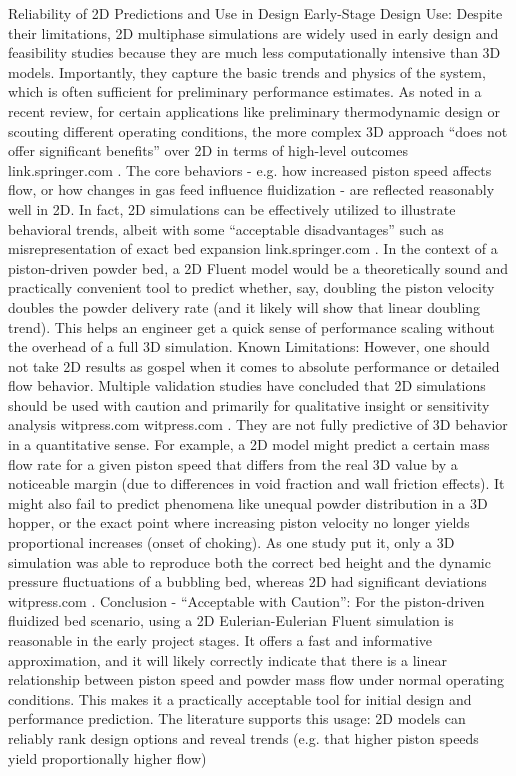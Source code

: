 Reliability of 2D Predictions and Use in Design
Early-Stage Design Use: Despite their limitations, 2D multiphase simulations are widely used in early design and feasibility studies because they are much less computationally intensive than 3D models. Importantly, they capture the basic trends and physics of the system, which is often sufficient for preliminary performance estimates. As noted in a recent review, for certain applications like preliminary thermodynamic design or scouting different operating conditions, the more complex 3D approach “does not offer significant benefits” over 2D in terms of high-level outcomes
link.springer.com
. The core behaviors - e.g. how increased piston speed affects flow, or how changes in gas feed influence fluidization - are reflected reasonably well in 2D. In fact, 2D simulations can be effectively utilized to illustrate behavioral trends, albeit with some “acceptable disadvantages” such as misrepresentation of exact bed expansion
link.springer.com
. In the context of a piston-driven powder bed, a 2D Fluent model would be a theoretically sound and practically convenient tool to predict whether, say, doubling the piston velocity doubles the powder delivery rate (and it likely will show that linear doubling trend). This helps an engineer get a quick sense of performance scaling without the overhead of a full 3D simulation. Known Limitations: However, one should not take 2D results as gospel when it comes to absolute performance or detailed flow behavior. Multiple validation studies have concluded that 2D simulations should be used with caution and primarily for qualitative insight or sensitivity analysis
witpress.com
witpress.com
. They are not fully predictive of 3D behavior in a quantitative sense. For example, a 2D model might predict a certain mass flow rate for a given piston speed that differs from the real 3D value by a noticeable margin (due to differences in void fraction and wall friction effects). It might also fail to predict phenomena like unequal powder distribution in a 3D hopper, or the exact point where increasing piston velocity no longer yields proportional increases (onset of choking). As one study put it, only a 3D simulation was able to reproduce both the correct bed height and the dynamic pressure fluctuations of a bubbling bed, whereas 2D had significant deviations
witpress.com
. Conclusion - “Acceptable with Caution”: For the piston-driven fluidized bed scenario, using a 2D Eulerian-Eulerian Fluent simulation is reasonable in the early project stages. It offers a fast and informative approximation, and it will likely correctly indicate that there is a linear relationship between piston speed and powder mass flow under normal operating conditions. This makes it a practically acceptable tool for initial design and performance prediction. The literature supports this usage: 2D models can reliably rank design options and reveal trends (e.g. that higher piston speeds yield proportionally higher flow)

